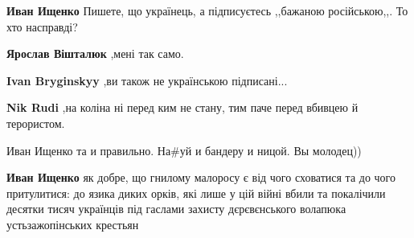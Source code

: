 \begin{itemize}
\begin{itemize}
\begin{itemize}
\textbf{Иван Ищенко} Пишете, що українець, а підписуєтесь ,,бажаною російською,,. То хто насправді?

 
\textbf{Ярослав Вішталюк} ,мені так само.

 
\textbf{Ivan Bryginskyy} ,ви також не українською підписані...

 
\textbf{Nik Rudi} ,на коліна ні перед ким не стану, тим паче перед вбивцею й терористом.

 
Иван Ищенко та и правильно. На\#уй и бандеру и ницой. Вы молодец))

 

\textbf{Иван Ищенко} як добре, що гнилому малоросу є від чого сховатися та до
чого притулитися: до язика диких орків, які лише у цій війні вбили та
покалічили десятки тисяч українців під гаслами захисту дєрєвєнського волапюка
устьзажопінських крестьян

 

\end{itemize}
\end{itemize}
\end{itemize}
